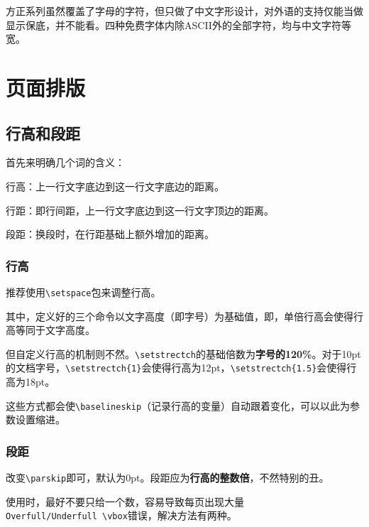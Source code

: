 \documentclass[10pt,openany]{book}
\begin{document}
\begin{sloppypar}
    方正系列虽然覆盖了字母的字符，但只做了中文字形设计，对外语的支持仅能当做显示保底，并不能看。四种免费字体内除ASCII外的全部字符，均与中文字符等宽。

    \chapter{页面排版}

    \section{行高和段距}

    首先来明确几个词的含义：

    行高：上一行文字底边到这一行文字底边的距离。

    行距：即行间距，上一行文字底边到这一行文字顶边的距离。

    段距：换段时，在行距基础上额外增加的距离。

    \subsection{行高}

    推荐使用\texttt{\textbackslash{}setspace}包来调整行高。

    

    其中，定义好的三个命令以文字高度（即字号）为基础值，即，单倍行高会使得行高等同于文字高度。

    但自定义行高的机制则不然。\texttt{\textbackslash{}setstrectch}的基础倍数为\textbf{字号的120\%}。对于10pt的文档字号，\texttt{\textbackslash{}setstrectch\{1\}}会使得行高为12pt，\texttt{\textbackslash{}setstrectch\{1.5\}}会使得行高为18pt。

    这些方式都会使\texttt{\textbackslash{}baselineskip}（记录行高的变量）自动跟着变化，可以以此为参数设置缩进。

    \subsection{段距}

    改变\texttt{\textbackslash{}parskip}即可，默认为0pt。段距应为\textbf{行高的整数倍}，不然特别的丑。

    

    使用时，最好不要只给一个数，容易导致每页出现大量\texttt{Overfull/Underfull\ \textbackslash{}vbox}错误，解决方法有两种。


\end{sloppypar}
\end{document}
